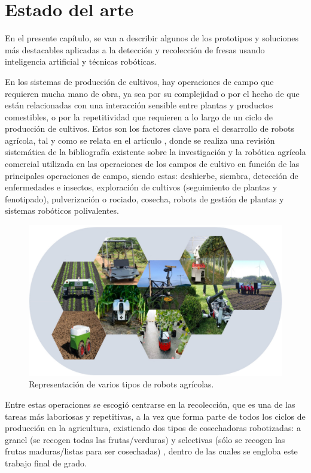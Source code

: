 \chapter{Estado del arte}
\label{cap:capitulo2}
	
En el presente capítulo, se van a describir algunos de los prototipos y soluciones más destacables aplicadas a la detección y recolección de fresas usando inteligencia artificial y técnicas robóticas.

En los sistemas de producción de cultivos, hay operaciones de campo que requieren mucha mano de obra, ya sea por su complejidad o por el hecho de que están relacionadas con una interacción sensible entre plantas y productos comestibles, o por la repetitividad que requieren a lo largo de un ciclo de producción de cultivos. Estos son los factores clave para el desarrollo de robots agrícola, tal y como se relata en el artículo \cite{Fountas20}, donde se realiza una revisión sistemática de la bibliografía existente sobre la investigación y la robótica agrícola comercial utilizada en las operaciones de los campos de cultivo en función de las principales operaciones de campo, siendo estas: deshierbe, siembra, detección de enfermedades e insectos, exploración de cultivos (seguimiento de plantas y fenotipado), pulverización o rociado, cosecha, robots de gestión de plantas y sistemas robóticos polivalentes.

\begin{figure} [h!]
    \begin{center}
      \includegraphics[width=12cm]{figs/Representación robots agrícolas.png}
    \end{center}
    \caption{Representación de varios tipos de robots agrícolas.}
    \label{fig:Robots_agricolas}
\end{figure}
\pagebreak

Entre estas operaciones se escogió centrarse en la recolección, que es una de las tareas más laboriosas y repetitivas, a la vez que forma parte de todos los ciclos de producción en la agricultura, existiendo dos tipos de cosechadoras robotizadas: a granel (se recogen todas las frutas/verduras) y selectivas (sólo se recogen las frutas maduras/listas para ser cosechadas) \cite{Fountas20}, dentro de las cuales se engloba este trabajo final de grado. 

